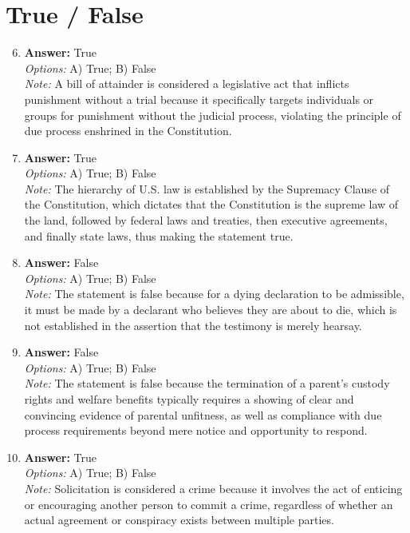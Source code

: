 \documentclass[12pt]{article}
\begin{document}
\section*{True / False}
\begin{enumerate}[label=\arabic*.]
\setcounter{enumi}{5}
\item \textbf{Answer:} True
\\ \textit{Options:} A) True; B) False
\\ \textit{Note:} A bill of attainder is considered a legislative act that inflicts punishment without a trial because it specifically targets individuals or groups for punishment without the judicial process, violating the principle of due process enshrined in the Constitution.
\item \textbf{Answer:} True
\\ \textit{Options:} A) True; B) False
\\ \textit{Note:} The hierarchy of U.S. law is established by the Supremacy Clause of the Constitution, which dictates that the Constitution is the supreme law of the land, followed by federal laws and treaties, then executive agreements, and finally state laws, thus making the statement true.
\item \textbf{Answer:} False
\\ \textit{Options:} A) True; B) False
\\ \textit{Note:} The statement is false because for a dying declaration to be admissible, it must be made by a declarant who believes they are about to die, which is not established in the assertion that the testimony is merely hearsay.
\item \textbf{Answer:} False
\\ \textit{Options:} A) True; B) False
\\ \textit{Note:} The statement is false because the termination of a parent's custody rights and welfare benefits typically requires a showing of clear and convincing evidence of parental unfitness, as well as compliance with due process requirements beyond mere notice and opportunity to respond.
\item \textbf{Answer:} True
\\ \textit{Options:} A) True; B) False
\\ \textit{Note:} Solicitation is considered a crime because it involves the act of enticing or encouraging another person to commit a crime, regardless of whether an actual agreement or conspiracy exists between multiple parties.
\end{enumerate}
\end{document}
